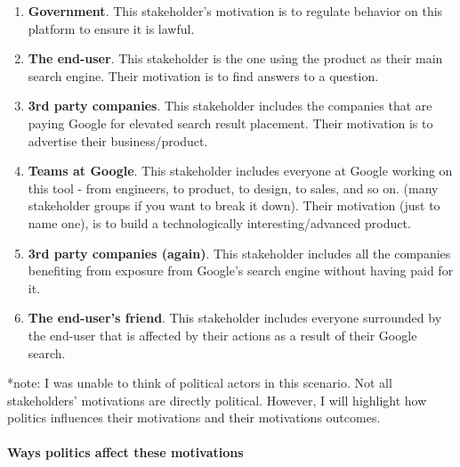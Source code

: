 \begin{enumerate}
\item
  \textbf{Government}. This stakeholder's motivation is to regulate behavior on this platform to ensure it is lawful.
\item
  \textbf{The end-user}. This stakeholder is the one using the product as their main search engine. Their motivation is to find answers to a question.
\item
  \textbf{3rd party companies}. This stakeholder includes the companies that are paying Google for elevated search result placement. Their motivation is to advertise their business/product.
\item
  \textbf{Teams at Google}. This stakeholder includes everyone at Google working on this tool - from engineers, to product, to design, to sales, and so on. (many stakeholder groups if you want to break it down). Their motivation (just to name one), is to build a technologically interesting/advanced product.
\item
  \textbf{3rd party companies (again)}. This stakeholder includes all the companies benefiting from exposure from Google's search engine without having paid for it.
\item
  \textbf{The end-user's friend}. This stakeholder includes everyone surrounded by the end-user that is affected by their actions as a result of their Google search.
\end{enumerate}

*note: I was unable to think of political actors in this scenario. Not all stakeholders' motivations are directly political. However, I will highlight how politics influences their motivations and their motivations outcomes.

\paragraph{Ways politics affect these motivations}

